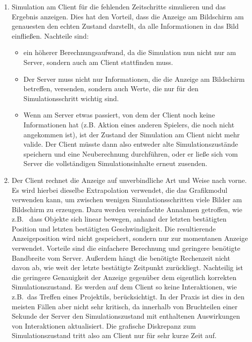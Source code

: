 \begin{enumerate}
\item Simulation am Client für die fehlenden Zeitschritte simulieren und das Ergebnis anzeigen. Dies hat den Vorteil, dass die Anzeige am Bildschirm am genauesten den echten Zustand darstellt, da alle Informationen in das Bild einfließen. Nachteile sind:
\begin{itemize}
 \item ein höherer Berechnungsaufwand, da die Simulation nun nicht nur am Server, sondern auch am Client stattfinden muss. 
 \item Der Server muss nicht nur Informationen, die die Anzeige am Bildschirm betreffen, versenden, sondern auch Werte, die nur für den Simulationsschritt wichtig sind.
 \item Wenn am Server etwas passiert, von dem der Client noch keine Informationen hat (z.B. Aktion eines anderen Spielers, die noch nicht angekommen ist), ist der Zustand der Simulation am Client nicht mehr valide. Der Client müsste dann also entweder alte Simulationszustände speichern und eine Neuberechnung durchführen, oder er ließe sich vom Server die vollständigen Simulationsinhalte erneut zusenden.
\end{itemize}
\item Der Client rechnet die Anzeige auf unverbindliche Art und Weise nach vorne. Es wird hierbei dieselbe Extrapolation verwendet, die das Grafikmodul verwenden kann, um zwischen wenigen Simulationsschritten viele Bilder am Bildschirm zu erzeugen. Dazu werden vereinfachte Annahmen getroffen, wie z.B.~ dass Objekte sich linear bewegen, anhand der letzten bestätigten Position und letzten bestätigten Geschwindigkeit. Die resultierende Anzeigeposition wird nicht gespeichert, sondern nur zur momentanen Anzeige verwendet.
Vorteile sind die einfachere Berechnung und geringere benötigte Bandbreite vom Server. Außerdem hängt die benötigte Rechenzeit nicht davon ab, wie weit der letzte bestätigte Zeitpunkt zurückliegt. 
Nachteilig ist die geringere Genauigkeit der Anzeige gegenüber dem eigentlich korrekten Simulationszustand. Es werden auf dem Client so keine Interaktionen, wie z.B.~das Treffen eines Projektils, berücksichtigt. 
In der Praxis ist dies in den meisten Fällen aber nicht sehr kritisch, da innerhalb von Bruchteilen einer Sekunde der Server den Simulationszustand mit enthaltenen Auswirkungen von Interaktionen aktualisiert. Die grafische Diskrepanz zum Simulationszustand tritt also am Client nur für sehr kurze Zeit auf.\\
\end{enumerate}
